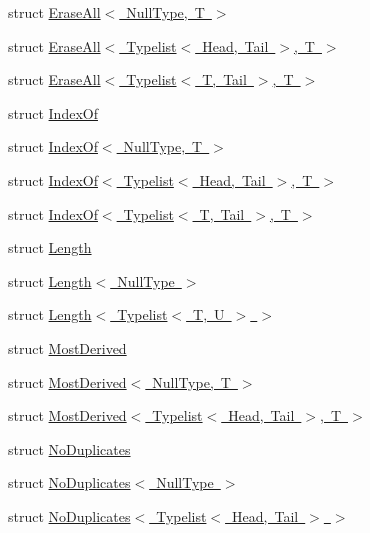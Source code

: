 \begin{DoxyCompactItemize}
\item 
struct \mbox{\hyperlink{structUtil_1_1TL_1_1EraseAll_3_01NullType_00_01T_01_4}{Erase\+All$<$ Null\+Type, T $>$}}
\item 
struct \mbox{\hyperlink{structUtil_1_1TL_1_1EraseAll_3_01Typelist_3_01Head_00_01Tail_01_4_00_01T_01_4}{Erase\+All$<$ Typelist$<$ Head, Tail $>$, T $>$}}
\item 
struct \mbox{\hyperlink{structUtil_1_1TL_1_1EraseAll_3_01Typelist_3_01T_00_01Tail_01_4_00_01T_01_4}{Erase\+All$<$ Typelist$<$ T, Tail $>$, T $>$}}
\item 
struct \mbox{\hyperlink{structUtil_1_1TL_1_1IndexOf}{Index\+Of}}
\item 
struct \mbox{\hyperlink{structUtil_1_1TL_1_1IndexOf_3_01NullType_00_01T_01_4}{Index\+Of$<$ Null\+Type, T $>$}}
\item 
struct \mbox{\hyperlink{structUtil_1_1TL_1_1IndexOf_3_01Typelist_3_01Head_00_01Tail_01_4_00_01T_01_4}{Index\+Of$<$ Typelist$<$ Head, Tail $>$, T $>$}}
\item 
struct \mbox{\hyperlink{structUtil_1_1TL_1_1IndexOf_3_01Typelist_3_01T_00_01Tail_01_4_00_01T_01_4}{Index\+Of$<$ Typelist$<$ T, Tail $>$, T $>$}}
\item 
struct \mbox{\hyperlink{structUtil_1_1TL_1_1Length}{Length}}
\item 
struct \mbox{\hyperlink{structUtil_1_1TL_1_1Length_3_01NullType_01_4}{Length$<$ Null\+Type $>$}}
\item 
struct \mbox{\hyperlink{structUtil_1_1TL_1_1Length_3_01Typelist_3_01T_00_01U_01_4_01_4}{Length$<$ Typelist$<$ T, U $>$ $>$}}
\item 
struct \mbox{\hyperlink{structUtil_1_1TL_1_1MostDerived}{Most\+Derived}}
\item 
struct \mbox{\hyperlink{structUtil_1_1TL_1_1MostDerived_3_01NullType_00_01T_01_4}{Most\+Derived$<$ Null\+Type, T $>$}}
\item 
struct \mbox{\hyperlink{structUtil_1_1TL_1_1MostDerived_3_01Typelist_3_01Head_00_01Tail_01_4_00_01T_01_4}{Most\+Derived$<$ Typelist$<$ Head, Tail $>$, T $>$}}
\item 
struct \mbox{\hyperlink{structUtil_1_1TL_1_1NoDuplicates}{No\+Duplicates}}
\item 
struct \mbox{\hyperlink{structUtil_1_1TL_1_1NoDuplicates_3_01NullType_01_4}{No\+Duplicates$<$ Null\+Type $>$}}
\item 
struct \mbox{\hyperlink{structUtil_1_1TL_1_1NoDuplicates_3_01Typelist_3_01Head_00_01Tail_01_4_01_4}{No\+Duplicates$<$ Typelist$<$ Head, Tail $>$ $>$}}

\end{DoxyCompactItemize}
